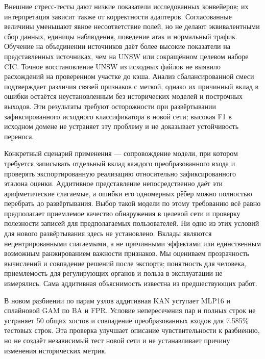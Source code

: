 Внешние стресс-тесты дают низкие показатели исследованных конвейеров; их интерпретация зависит также от корректности адаптеров. Согласованные величины уменьшают явное несоответствие полей, но не делают эквивалентными сбор данных, единицы наблюдения, поведение атак и нормальный трафик. Обучение на объединении источников даёт более высокие показатели на представленных источниках, чем на UNSW или сокращённом целевом наборе CIC. Точное восстановление UNSW из исходных файлов не выявило расхождений на проверенном участке до кэша. Анализ сбалансированной смеси подтверждает различия связей признаков с меткой, однако их причинный вклад в ошибки остаётся неустановленным без исторических моделей и построчных выходов. Эти результаты требуют осторожности при развёртывании зафиксированного исходного классификатора в новой сети; высокая F1 в исходном домене не устраняет эту проблему и не доказывает устойчивость переноса.

Конкретный сценарий применения --- сопровождение модели, при котором требуется записывать отдельный вклад каждого преобразованного входа и проверять экспортированную реализацию относительно зафиксированного эталона оценки. Аддитивное представление непосредственно даёт эти арифметические слагаемые, а ошибки его одномерных рёбер можно полностью перебрать до развёртывания. Выбор такой модели по этому требованию всё равно предполагает приемлемое качество обнаружения в целевой сети и проверку полезности записей для предполагаемых пользователей. Ни одно из этих условий для нового развёртывания здесь не установлено. Вклады являются нецентрированными слагаемыми, а не причинными эффектами или единственным возможным ранжированием важности признаков. Мы оцениваем прозрачность вычислений и совпадение решений после экспорта; понятность для человека, приемлемость для регулирующих органов и польза в эксплуатации не измерялись. Сама аддитивная объяснимость известна из предшествующих работ.

В новом разбиении по парам узлов аддитивная KAN уступает MLP16 и сплайновой GAM по BA и FPR. Условие непересечения пар и полных строк не устраняет 50 общих хостов и совпадение преобразованных входов для 7.585\% тестовых строк. Эта проверка улучшает описание чувствительности к разбиению, но не создаёт независимый тест новой сети и не устанавливает причину изменения исторических метрик.

